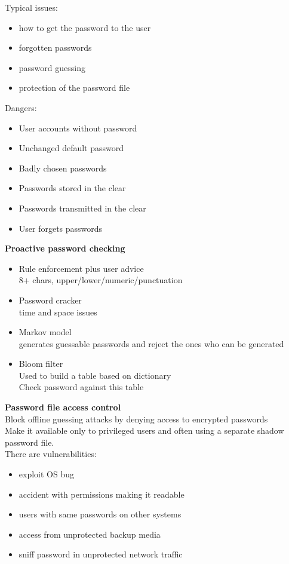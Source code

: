\documentclass[10pt,a4paper]{book}
\begin{document}
Typical issues:
\begin{itemize}
\item how to get the password to the user
\item forgotten passwords
\item password guessing
\item protection of the password file
\end{itemize}
Dangers:
\begin{itemize}
\item User accounts without password
\item Unchanged default password
\item Badly chosen passwords
\item Passwords stored in the clear
\item Passwords transmitted in the clear
\item User forgets passwords
\end{itemize}
\textbf{Proactive password checking}
\begin{itemize}
\item Rule enforcement plus user advice\\
8+ chars, upper/lower/numeric/punctuation
\item Password cracker\\
time and space issues
\item Markov model\\
generates guessable passwords and reject the ones who can be generated
\item Bloom filter\\
Used to build a table based on dictionary\\
Check password against this table
\end{itemize}
\textbf{Password file access control}\\
Block offline guessing attacks by denying access to encrypted passwords\\
Make it available only to privileged users and often using a separate shadow password file.\\
There are vulnerabilities:
\begin{itemize}
\item exploit OS bug
\item accident with permissions making it readable
\item users with same passwords on other systems
\item access from unprotected backup media
\item sniff password in unprotected network traffic
\end{itemize}
\end{document}
